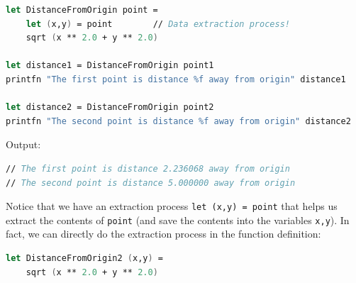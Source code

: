 \documentclass[12pt]{article}
\begin{document}
\begin{lstlisting}[language=FSharp]
let DistanceFromOrigin point =
    let (x,y) = point        // Data extraction process!
    sqrt (x ** 2.0 + y ** 2.0)

let distance1 = DistanceFromOrigin point1
printfn "The first point is distance %f away from origin" distance1

let distance2 = DistanceFromOrigin point2
printfn "The second point is distance %f away from origin" distance2
\end{lstlisting}
Output:
\begin{lstlisting}[language=FSharp]
// The first point is distance 2.236068 away from origin
// The second point is distance 5.000000 away from origin
\end{lstlisting}
Notice that we have an extraction process \texttt{let (x,y) = point} that helps us extract the contents of \texttt{point} (and save the contents into the variables \texttt{x,y}). In fact, we can directly do the extraction process in the function definition:
\begin{lstlisting}[language=FSharp]
let DistanceFromOrigin2 (x,y) =
    sqrt (x ** 2.0 + y ** 2.0)
\end{lstlisting}
\pagebreak
\end{document}
